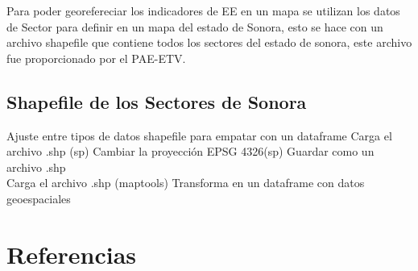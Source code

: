 \documentclass[
  letterpaper,
  twocolumn,
  landscape]{report}
\begin{document}
Para poder georefereciar los indicadores de EE en un mapa se utilizan
los datos de Sector para definir en un mapa del estado de Sonora, esto
se hace con un archivo shapefile que contiene todos los sectores del
estado de sonora, este archivo fue proporcionado por el PAE-ETV.

\section{Shapefile de los Sectores de
Sonora}\label{shapefile-de-los-sectores-de-sonora}

Ajuste entre tipos de datos shapefile para empatar con un dataframe
Carga el archivo .shp (sp) Cambiar la proyección EPSG 4326(sp) Guardar
como un archivo .shp\\
Carga el archivo .shp (maptools) Transforma en un dataframe con datos
geoespaciales


\chapter{Referencias}\label{referencias}
\end{document}
